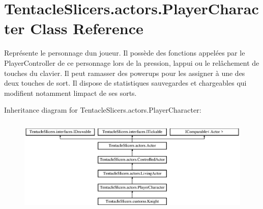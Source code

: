 \hypertarget{class_tentacle_slicers_1_1actors_1_1_player_character}{}\section{Tentacle\+Slicers.\+actors.\+Player\+Character Class Reference}
\label{class_tentacle_slicers_1_1actors_1_1_player_character}


Représente le personnage d\textquotesingle{}un joueur. Il possède des fonctions appelées par le Player\+Controller de ce personnage lors de la pression, l\textquotesingle{}appui ou le relâchement de touches du clavier. Il peut ramasser des powerups pour les assigner à une des deux touches de sort. Il dispose de statistiques sauvegardes et chargeables qui modifient notamment l\textquotesingle{}impact de ses sorts.  


Inheritance diagram for Tentacle\+Slicers.\+actors.\+Player\+Character\+:\begin{figure}[H]
\begin{center}
\leavevmode
\includegraphics[height=4.590164cm]{class_tentacle_slicers_1_1actors_1_1_player_character}
\end{center}
\end{figure}
